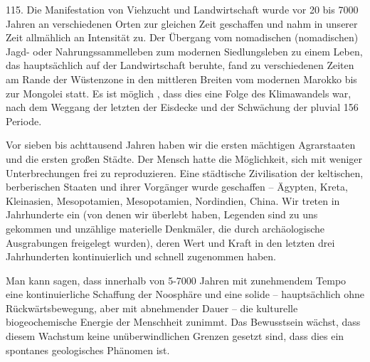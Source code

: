 \documentclass[11pt,a4paper]{book}
\begin{document}
115. Die Manifestation von Viehzucht und Landwirtschaft wurde vor 20 bis 7000 Jahren an verschiedenen Orten zur gleichen Zeit geschaffen und nahm in unserer Zeit allmählich an Intensität zu. Der Übergang vom nomadischen (nomadischen) Jagd- oder Nahrungssammelleben zum modernen Siedlungsleben zu einem Leben, das hauptsächlich auf der Landwirtschaft beruhte, fand zu verschiedenen Zeiten am Rande der Wüstenzone in den mittleren Breiten vom modernen Marokko bis zur Mongolei statt. Es ist möglich , dass dies eine Folge des Klimawandels war, nach dem Weggang der letzten der Eisdecke und der Schwächung der pluvial 156 Periode.



Vor sieben bis achttausend Jahren haben wir die ersten mächtigen Agrarstaaten und die ersten großen Städte. Der Mensch hatte die Möglichkeit, sich mit weniger Unterbrechungen frei zu reproduzieren. Eine städtische Zivilisation der keltischen, berberischen Staaten und ihrer Vorgänger wurde geschaffen -- Ägypten, Kreta, Kleinasien, Mesopotamien, Mesopotamien, Nordindien, China. Wir treten in Jahrhunderte ein (von denen wir überlebt haben, Legenden sind zu uns gekommen und unzählige materielle Denkmäler, die durch archäologische Ausgrabungen freigelegt wurden), deren Wert und Kraft in den letzten drei Jahrhunderten kontinuierlich und schnell zugenommen haben.



Man kann sagen, dass innerhalb von 5-7000 Jahren mit zunehmendem Tempo eine kontinuierliche Schaffung der Noosphäre und eine solide -- hauptsächlich ohne Rückwärtsbewegung, aber mit abnehmender Dauer -- die kulturelle biogeochemische Energie der Menschheit zunimmt. Das Bewusstsein wächst, dass diesem Wachstum keine unüberwindlichen Grenzen gesetzt sind, dass dies ein spontanes geologisches Phänomen ist.
\end{document}
